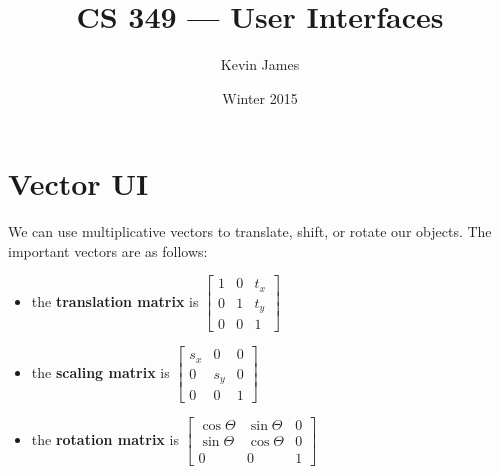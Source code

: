 \documentclass[12pt]{article}
\begin{document}
\title{CS 349 --- User Interfaces}
\author{Kevin James}
\date{\vspace{-2ex}Winter 2015}
\maketitle\HRule

\tableofcontents
\newpage

\section{Vector UI}
We can use multiplicative vectors to translate, shift, or rotate our objects. The important vectors are as follows:
\begin{itemize}
\item the {\bf translation matrix} is $\begin{bmatrix}1 & 0 & t_x \\ 0 & 1 & t_y \\ 0 & 0 & 1 \end{bmatrix}$
\item the {\bf scaling matrix} is $\begin{bmatrix}s_x & 0 & 0 \\ 0 & s_y & 0 \\ 0 & 0 & 1 \end{bmatrix}$
\item the {\bf rotation matrix} is $\begin{bmatrix}\cos\Theta & \sin\Theta & 0 \\ \sin\Theta & \cos\Theta & 0 \\ 0 & 0 & 1 \end{bmatrix}$
\end{itemize}
\end{document}
